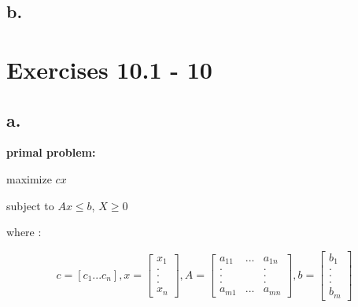 \documentclass{article}
\begin{document}
\bigbreak

\bigbreak

\bigbreak

\bigbreak

\bigbreak

\subsection*{b.}

\bigbreak

\bigbreak

\bigbreak

\bigbreak

\bigbreak

\bigbreak

\bigbreak

\section{Exercises 10.1 - 10}

\subsection*{a.}

\textbf{primal problem:}

maximize $cx$

subject to $Ax \leq b$,  $X \geq 0$

where :


\[
c = [c_1 ... c_n], 
x = 
\left[
  \begin{array}{c}
    x_1\\
    .\\
    .\\
    .\\
    x_n
  \end{array}
\right], 
A =
\left[
  \begin{array}{ccc}
    a_{11}&...&a_{1n}\\
    .& &.\\
    .& &.\\
    .& &.\\
    a_{m1}& ... & a_{mn}
  \end{array}
\right],
b = 
\left[
\begin{array}{c}
  b_1\\
  .\\
  .\\
  .\\
  b_m
\end{array}
\right]
\]
\end{document}
